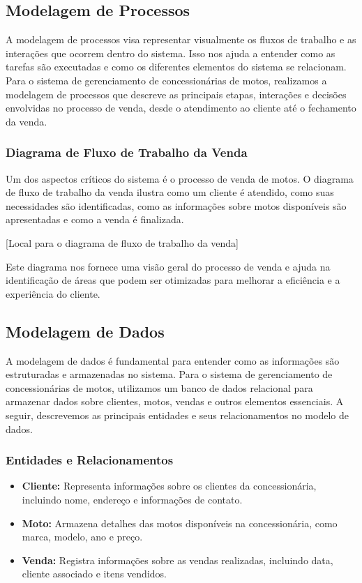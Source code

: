 \subsection{Modelagem de Processos}

A modelagem de processos visa representar visualmente os fluxos de trabalho e as interações que ocorrem dentro do sistema. Isso nos ajuda a entender como as tarefas são executadas e como os diferentes elementos do sistema se relacionam. Para o sistema de gerenciamento de concessionárias de motos, realizamos a modelagem de processos que descreve as principais etapas, interações e decisões envolvidas no processo de venda, desde o atendimento ao cliente até o fechamento da venda.

\subsubsection{Diagrama de Fluxo de Trabalho da Venda}

Um dos aspectos críticos do sistema é o processo de venda de motos. O diagrama de fluxo de trabalho da venda ilustra como um cliente é atendido, como suas necessidades são identificadas, como as informações sobre motos disponíveis são apresentadas e como a venda é finalizada.

[Local para o diagrama de fluxo de trabalho da venda]

Este diagrama nos fornece uma visão geral do processo de venda e ajuda na identificação de áreas que podem ser otimizadas para melhorar a eficiência e a experiência do cliente.

\subsection{Modelagem de Dados}

A modelagem de dados é fundamental para entender como as informações são estruturadas e armazenadas no sistema. Para o sistema de gerenciamento de concessionárias de motos, utilizamos um banco de dados relacional para armazenar dados sobre clientes, motos, vendas e outros elementos essenciais. A seguir, descrevemos as principais entidades e seus relacionamentos no modelo de dados.

\subsubsection{Entidades e Relacionamentos}

\begin{itemize}
	\item \textbf{Cliente:} Representa informações sobre os clientes da concessionária, incluindo nome, endereço e informações de contato.
	\item \textbf{Moto:} Armazena detalhes das motos disponíveis na concessionária, como marca, modelo, ano e preço.
	\item \textbf{Venda:} Registra informações sobre as vendas realizadas, incluindo data, cliente associado e itens vendidos.
\end{itemize}

